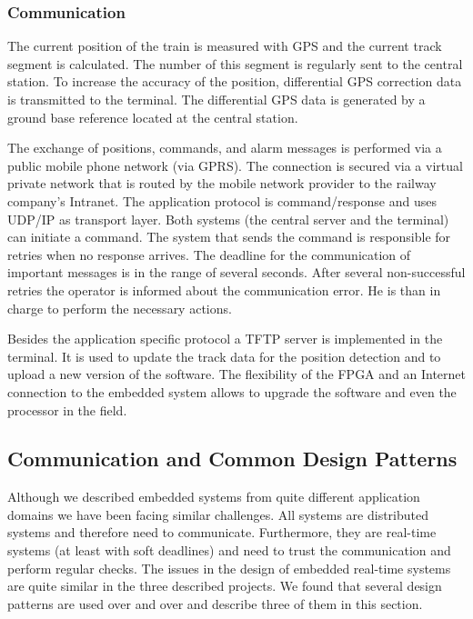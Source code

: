 \subsubsection{Communication}

The current position of the train is measured with GPS and the
current track segment is calculated. The number of this segment is
regularly sent to the central station. To increase the accuracy of
the position, differential GPS correction data is transmitted to the
terminal. The differential GPS data is generated by a ground base
reference located at the central station.

The exchange of positions, commands, and alarm messages is performed
via a public mobile phone network (via GPRS). The connection is
secured via a virtual private network that is routed by the mobile
network provider to the railway company's Intranet. The application
protocol is command/response and uses UDP/IP as transport layer. Both
systems (the central server and the terminal) can initiate a command.
The system that sends the command is responsible for retries when no
response arrives. The deadline for the communication of important
messages is in the range of several seconds. After several
non-successful retries the operator is informed about the
communication error. He is than in charge to perform the necessary
actions.

Besides the application specific protocol a TFTP server is
implemented in the terminal. It is used to update the track data for
the position detection and to upload a new version of the software.
The flexibility of the FPGA and an Internet connection to the
embedded system allows to upgrade the software and even the processor
in the field.


\subsection{Communication and Common Design Patterns} \label{sec:comm}

Although we described embedded systems from quite different
application domains we have been facing similar challenges. All
systems are distributed systems and therefore need to communicate.
Furthermore, they are real-time systems (at least with soft
deadlines) and need to trust the communication and perform regular
checks. The issues in the design of embedded real-time systems are
quite similar in the three described projects. We found that several
design patterns are used over and over and describe three of them in
this section.


